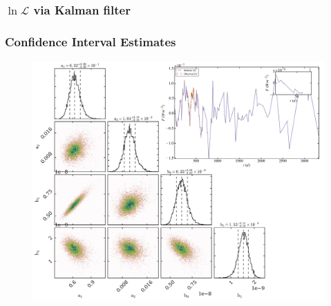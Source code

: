 \documentclass[hyperref={pdfpagelabels=false}]{beamer}
\begin{document}
\begin{frame}
\frametitle{$\ln \mathcal{L}$ via Kalman filter}
  \begin{center}
    \centering
  \end{center}
\end{frame}

\begin{frame}
\frametitle{Confidence Interval Estimates}
  \begin{figure}
    \includegraphics[scale=0.075]{images/CARMA(2,1)_Recovery.jpg}
  \end{figure}
\end{frame}
\end{document}
